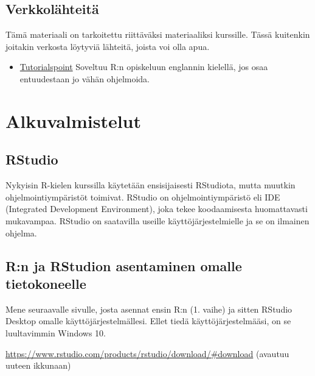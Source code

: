\documentclass[
]{book}
\providecommand{\tightlist}{%
  \setlength{\itemsep}{0pt}\setlength{\parskip}{0pt}}
\begin{document}
\hypertarget{verkkoluxe4hteituxe4}{%
\section*{Verkkolähteitä}\label{verkkoluxe4hteituxe4}}

Tämä materiaali on tarkoitettu riittäväksi materiaaliksi kurssille. Tässä kuitenkin joitakin verkosta löytyviä lähteitä, joista voi olla apua.

\begin{itemize}
\tightlist
\item
  \href{https://www.tutorialspoint.com/r/index.htm}{Tutorialspoint} Soveltuu R:n opiskeluun englannin kielellä, jos osaa entuudestaan jo vähän ohjelmoida.
\end{itemize}

\hypertarget{alkuvalmistelut}{%
\chapter*{Alkuvalmistelut}\label{alkuvalmistelut}}

\hypertarget{rstudio}{%
\section*{RStudio}\label{rstudio}}

Nykyisin R-kielen kurssilla käytetään ensisijaisesti RStudiota, mutta muutkin ohjelmointiympäristöt toimivat. RStudio on ohjelmointiympäristö eli IDE (Integrated Development Environment), joka tekee koodaamisesta huomattavasti mukavampaa. RStudio on saatavilla useille käyttöjärjestelmielle ja se on ilmainen ohjelma.

\hypertarget{rn-ja-rstudion-asentaminen-omalle-tietokoneelle}{%
\section*{R:n ja RStudion asentaminen omalle tietokoneelle}\label{rn-ja-rstudion-asentaminen-omalle-tietokoneelle}}

Mene seuraavalle sivulle, josta asennat ensin R:n (1. vaihe) ja sitten RStudio Desktop omalle käyttöjärjestelmällesi. Ellet tiedä käyttöjärjestelmääsi, on se luultavimmin Windows 10.

\url{https://www.rstudio.com/products/rstudio/download/\#download} (avautuu uuteen ikkunaan)
\end{document}
